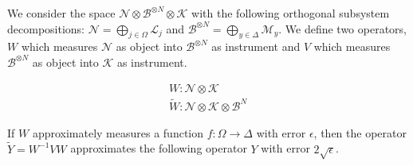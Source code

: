 \begin{theorem}
\label{thm:coherent}
We consider the space
$\mathcal{N} \otimes \mathcal{B}^{\otimes N} \otimes \mathcal{K}$ with the
following orthogonal subsystem decompositions:
$\mathcal{N} = \bigoplus_{j \in \Omega} \mathcal{L}_j$ and
$\mathcal{B}^{\otimes N} = \bigoplus_{y \in \Delta} \mathcal{M}_y$. We
define two operators, $W$ which measures $\mathcal{N}$ as object into
$\mathcal{B}^{\otimes N}$ as instrument and $V$ which measures
$\mathcal{B}^{\otimes N}$ as object into $\mathcal{K}$ as instrument.

\begin{eqnarray}
W : \mathcal{N} \otimes \mathcal{K}\\
\tilde{W} : \mathcal{N} \otimes \mathcal{K} \otimes \mathcal{B}^N
\end{eqnarray}

If $W$ approximately measures a function $f : \Omega \rightarrow \Delta$
with error $\epsilon$, then the operator $\tilde{Y} = W^{-1}VW$ approximates
the following operator $Y$ with error $2\sqrt{\epsilon}$.

\end{theorem}


